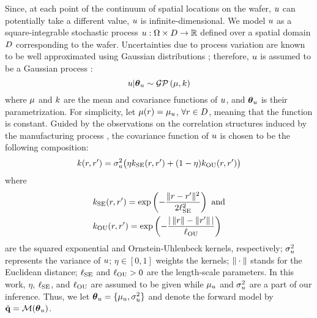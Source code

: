 Since, at each point of the continuum of spatial locations on the wafer, $u$ can potentially take a different value, $u$ is infinite-dimensional. We model $u$ as a square-integrable stochastic process $u: \Omega \times D \to \mathbb{R}$ defined over a spatial domain $D$ corresponding to the wafer. Uncertainties due to process variation are known to be well approximated using Gaussian distributions \cite{srivastava2010}; therefore, $u$ is assumed to be a Gaussian process \cite{rasmussen2006}:
\[
  \u | \vparam_\u \sim \gaussianp{\fMean}{\fCov}
\]
where $\fMean$ and $\fCov$ are the mean and covariance functions of $u$, and ${\boldsymbol\theta}_u$ is their parametrization. For simplicity, let $\fMean{\r} = \mu_\u$, $\forall r \in D$, meaning that the function is constant. Guided by the observations on the correlation structures induced by the manufacturing process \cite{cheng2011}, the covariance function of $u$ is chosen to be the following composition:
\begin{equation} \elabel{covariance-function}
  \fCov{\r, \r'} = \sigma_\u^2 \big( \eta \fCov_\SE(\r, \r') + (1 - \eta) \fCov_\OU(\r, \r') \big)
\end{equation}
where
\begin{align*}
  & \fCov_\SE(\r, \r') = \exp\left(-\frac{\norm{\r - \r'}^2}{2 \ell_\SE^2}\right) \text{ and} \\
  & \fCov_\OU(\r, \r') = \exp\left(- \frac{\abs{\,\norm{\r} - \norm{\r'}\,}}{\ell_\OU} \right)
\end{align*}
are the squared exponential and Ornstein-Uhlenbeck kernels, respectively; $\sigma_u^2$ represents the variance of $u$; $\eta \in [0, 1]$ weights the kernels; $\| \cdot \|$ stands for the Euclidean distance; $\ell_{\text{SE}}$ and $\ell_{\text{OU}} > 0$ are the length-scale parameters. In this work, $\eta$, $\ell_{\text{SE}}$, and $\ell_{\text{OU}}$ are assumed to be given while $\mu_u$ and $\sigma^2_u$ are a part of our inference. Thus, we let ${\boldsymbol\theta}_u = \{ \mu_u, \sigma_u^2 \}$ and denote the forward model by $\mvT = \model{\vparam_\u}$.


